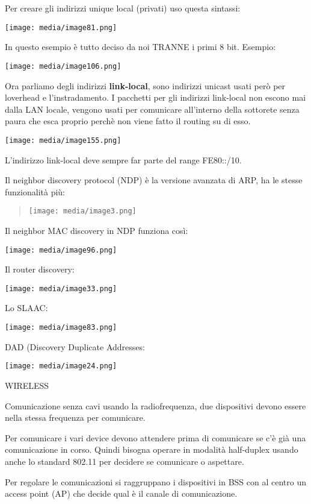 Per creare gli indirizzi unique local (privati) uso questa sintassi:

\texttt{[image: media/image81.png]}

In questo esempio è tutto deciso da noi TRANNE i primi 8 bit. Esempio:

\texttt{[image: media/image106.png]}

Ora parliamo degli indirizzi \textbf{link-local}, sono indirizzi unicast
usati però per l\textquotesingle overhead e l'instradamento. I pacchetti
per gli indirizzi link-local non escono mai dalla LAN locale, vengono
usati per comunicare all'interno della sottorete senza paura che esca
proprio perchè non viene fatto il routing su di esso.

\texttt{[image: media/image155.png]}

L'indirizzo link-local deve sempre far parte del range FE80::/10.

Il neighbor discovery protocol (NDP) è la versione avanzata di ARP, ha
le stesse funzionalità più:

\begin{quote}
\texttt{[image: media/image3.png]}
\end{quote}

Il neighbor MAC discovery in NDP funziona così:

\texttt{[image: media/image96.png]}

Il router discovery:

\texttt{[image: media/image33.png]}

Lo SLAAC:

\texttt{[image: media/image83.png]}

DAD (Discovery Duplicate Addresses:

\texttt{[image: media/image24.png]}

WIRELESS

Comunicazione senza cavi usando la radiofrequenza, due dispositivi
devono essere nella stessa frequenza per comunicare.

Per comunicare i vari device devono attendere prima di comunicare se c'è
già una comunicazione in corso. Quindi bisogna operare in modalità
half-duplex usando anche lo standard 802.11 per decidere se comunicare o
aspettare.

Per regolare le comunicazioni si raggruppano i dispositivi in BSS con al
centro un access point (AP) che decide qual è il canale di
comunicazione.

